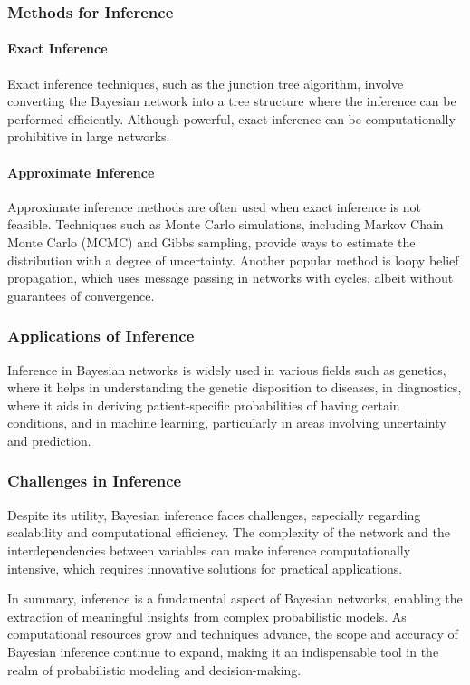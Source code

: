 \subsubsection{Methods for Inference}
\paragraph{Exact Inference}
Exact inference techniques, such as the junction tree algorithm, involve converting the Bayesian network into a tree structure where the inference can be performed efficiently. Although powerful, exact inference can be computationally prohibitive in large networks.

\paragraph{Approximate Inference}
Approximate inference methods are often used when exact inference is not feasible. Techniques such as Monte Carlo simulations, including Markov Chain Monte Carlo (MCMC) and Gibbs sampling, provide ways to estimate the distribution with a degree of uncertainty. Another popular method is loopy belief propagation, which uses message passing in networks with cycles, albeit without guarantees of convergence.

\subsubsection{Applications of Inference}
Inference in Bayesian networks is widely used in various fields such as genetics, where it helps in understanding the genetic disposition to diseases, in diagnostics, where it aids in deriving patient-specific probabilities of having certain conditions, and in machine learning, particularly in areas involving uncertainty and prediction.

\subsubsection{Challenges in Inference}
Despite its utility, Bayesian inference faces challenges, especially regarding scalability and computational efficiency. The complexity of the network and the interdependencies between variables can make inference computationally intensive, which requires innovative solutions for practical applications.

In summary, inference is a fundamental aspect of Bayesian networks, enabling the extraction of meaningful insights from complex probabilistic models. As computational resources grow and techniques advance, the scope and accuracy of Bayesian inference continue to expand, making it an indispensable tool in the realm of probabilistic modeling and decision-making.


